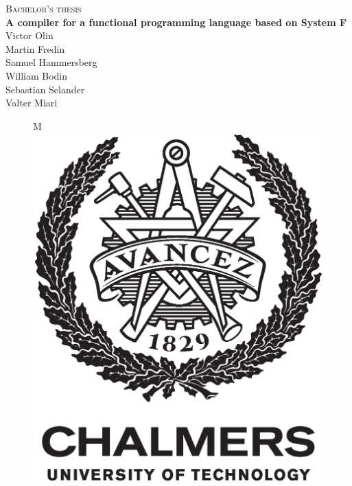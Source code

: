 \newpage
\thispagestyle{empty}
\begin{center}
	\textsc{\large Bachelor's thesis \the\year}\\[4cm]
	\textbf{\Large A compiler for a functional programming language based on System F} \\[1cm]
	{\large Victor Olin}\\[1mm]
	{\large Martin Fredin}\\[1mm]
	{\large Samuel Hammersberg}\\[1mm]
	{\large William Bodin}\\[1mm]
	{\large Sebastian Selander}\\[1mm]
	{\large Valter Miari}
	
	\vfill	
	\begin{figure}[H]
	\centering
	\if\ThesisType M
    \includegraphics[width=0.2\pdfpagewidth]{figure/auxiliary/AvancezChalmersU_black_centered.eps} \\

\end{figure}
\end{center}

